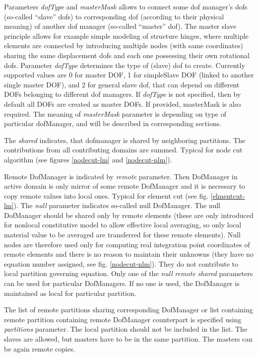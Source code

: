 \documentclass[a4paper]{article}
\newcommand{\param}[1]{{\em #1}}
\newcommand{\Pmode}[1]{{\sffamily #1}}
\begin{document}
Parameters \param{dofType} and \param{masterMask} allows to connect some dof manager's dofs
(so-called ``slave'' dofs)
to corresponding dof (according to their physical meaning) of another
dof manager (so-called ``master'' dof). The master slave principle
allows for example simple modeling of structure hinges, where multiple
elements are connected by introducing multiple nodes (with same
coordinates) sharing the same displacement dofs and each one possessing
their own rotational dofs.
Parameter
\param{dofType} determines the type of (slave) dof to
create. Currently supported values are 0 for master DOF, 1 for simpleSlave DOF (linked to another single master DOF), and 2 for general
slave dof, that can depend on different DOFs belonging to different
dof managers.
If \param{dofType} is not specified, then by default all DOFs are
created as master DOFs. If provided, masterMask is also required.
The meaning of \param{masterMask} parameter is
depending on type of particular dofManager, and will be described in
corresponding sections.

\Pmode{
The \param{shared} indicates, that dofmanager is shared by
neighboring partitions. The contributions from all contributing
domains are summed. Typical for node cut algorithm (see figures \ref{nodecut-lm}
and \ref{nodecut-nlm}).

Remote DofManager is indicated by \param{remote} parameter.
Then DofManager in active domain is only mirror of some remote
DofManager and it is necessary to copy remote values into local
ones. Typical for element cut (see fig. \ref{elmentcut-lm}).
The \param{null} parameter indicates so-called null DofManager. The
null DofManager should be shared only by remote elements (these are
only introduced for nonlocal constitutive model to allow effective
local averaging, so only local material value to be averaged are
transferred for these remote elements). Null nodes are therefore used
only for computing real integration point coordinates of remote
elements and there is no reason to maintain their unknowns (they have
no equation number assigned, see fig. \ref{nodecut-nlm}). They do not
contribute to local partition governing equation.
Only one of the \param{null} \param{remote} \param{shared} parameters can
be used for particular DofManagers. If no one is used, the DofManager
is maintained as local for particular partition.

The list of remote partitions sharing corresponding DofManager or list
containing  remote partition containing remote DofManager counterpart is
specified using \param{partitions} parameter. The local partition
should not be included in the list.
The slaves are allowed, but masters have to be in the same
partition. The masters can be again remote copies.
}
\end{document}
